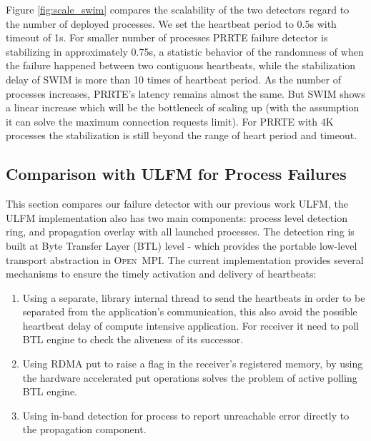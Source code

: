 \documentclass[sigconf]{acmart}
\newcommand{\prrte}[0]{\textsc{PRRTE}\xspace}
\newcommand{\ompi}[0]{\textsc{Open~MPI}\xspace}
\newcommand{\ulfm}[0]{\textsc{ULFM}\xspace}
\begin{document}
Figure \ref{fig:scale_swim} compares the scalability of the two detectors regard to the number of deployed processes. We set the heartbeat period to 0.5s with timeout of 1s. For smaller number of processes \prrte failure detector is stabilizing in approximately 0.75s, a statistic behavior of the randomness of when the failure happened between two contiguous heartbeats, while the stabilization delay of SWIM is more than 10 times of heartbeat period. As the number of processes increases, \prrte's latency remains almost the same. But SWIM shows a linear increase which will be the bottleneck of scaling up (with the assumption it can solve the maximum connection requests limit). For \prrte with 4K processes the stabilization is still beyond the range of heart period and timeout.

\subsection{Comparison with \ulfm for Process Failures}
This section compares our failure detector with our previous work \ulfm, the \ulfm implementation also has two main components: process level detection ring, and propagation overlay with all launched processes. The detection ring is built at Byte Transfer Layer (BTL) level - which provides the portable low-level transport abstraction in \ompi. The current implementation provides several mechanisms to ensure the timely activation and delivery of heartbeats:
\begin{enumerate}
  \item Using a separate, library internal thread to send the heartbeats in order to be separated from the application's communication, this also avoid the possible heartbeat delay of compute intensive application. For receiver it need to poll BTL engine to check the aliveness of its successor. 
  \item Using RDMA put to raise a flag in the receiver's registered memory, by using the hardware accelerated put operations solves the problem of active polling BTL engine. 
  \item Using in-band detection for process to report unreachable error directly to the propagation component.
\end{enumerate}
\end{document}
